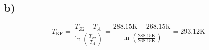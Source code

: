 

\subsection*{b)}

\[
T_{\text{KF}} = \frac{T_{Z2} - T_A}{\ln \left( \frac{T_{Z2}}{T_A} \right)} = \frac{288.15 \text{K} - 268.15 \text{K}}{\ln \left( \frac{288.15 \text{K}}{268.15 \text{K}} \right)} = 293.12 \text{K}
\]